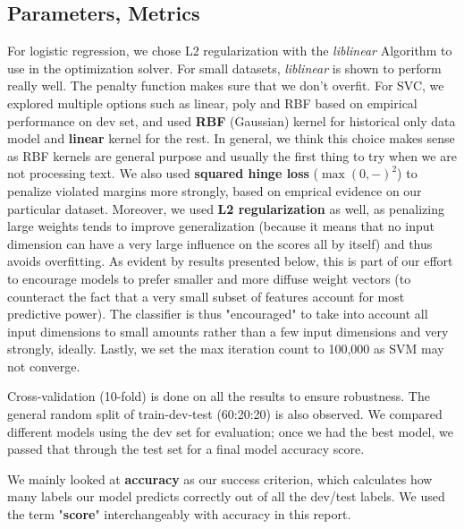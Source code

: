 \documentclass[paper=a4, fontsize=10pt]{scrartcl} %
\numberwithin{equation}{section} %
\numberwithin{figure}{section} %
\numberwithin{table}{section} %
\begin{document}
\subsection{Parameters, Metrics}
For logistic regression, we chose L2 regularization with the \textit{liblinear} Algorithm \cite{hsieh2008dual} to use in the optimization solver. For small datasets, \textit{liblinear} is shown to perform really well. The penalty function makes sure that we don't overfit. 
For SVC, we explored multiple options such as linear, poly and RBF based on empirical performance on dev set, and used \textbf{RBF} (Gaussian) kernel for historical only data model and \textbf{linear} kernel for the rest. In general, we think this choice makes sense as RBF kernels are general purpose and usually the first thing to try when we are not processing text. We also used \textbf{squared hinge loss} ($\max(0,-)^2$) to penalize violated margins more strongly, based on emprical evidence on our particular dataset. Moreover, we used \textbf{L2 regularization} as well, as penalizing large weights tends to improve generalization (because it means that no input dimension can have a very large influence on the scores all by itself) and thus avoids overfitting. As evident by results presented below, this is part of our effort to encourage models to prefer smaller and more diffuse weight vectors (to counteract the fact that a very small subset of features account for most predictive power). The classifier is thus "encouraged" to take into account all input dimensions to small amounts rather than a few input dimensions and very strongly, ideally. Lastly, we set the max iteration count to 100,000 as SVM may not converge. 

Cross-validation (10-fold) is done on all the results to ensure robustness. The general random split of train-dev-test (60:20:20) is also observed. We compared different models using the dev set for evaluation; once we had the best model, we passed that through the test set for a final model accuracy score. 

We mainly looked at \textbf{accuracy} as our success criterion, which calculates how many labels our model predicts correctly out of all the dev/test labels.  We used the term "\textbf{score}" interchangeably with accuracy in this report. 
\end{document}
